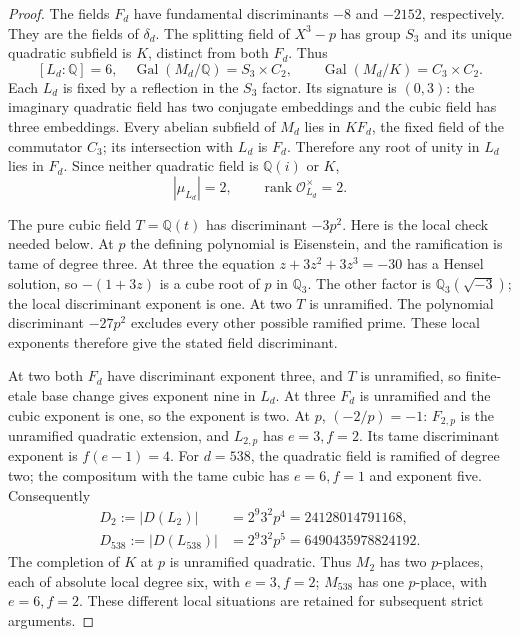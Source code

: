 \begin{proof}
The fields $F_d$ have fundamental discriminants $-8$ and $-2152$,
respectively.  They are the fields of $\delta_d$.
The splitting field of $X^3-p$ has group $S_3$ and its unique
quadratic subfield is $K$, distinct from both $F_d$.
Thus
\[
 [L_d:\mathbb Q]=6,\quad
 \operatorname{Gal}(M_d/\mathbb Q)=S_3\times C_2,
 \qquad \operatorname{Gal}(M_d/K)=C_3\times C_2.
 \tag{G150C.4}
\]
Each $L_d$ is fixed by a reflection in the $S_3$ factor.
Its signature is $(0,3)$: the imaginary quadratic field has two
conjugate embeddings and the cubic field has three embeddings.
Every abelian subfield of $M_d$ lies in $KF_d$, the fixed field
of the commutator $C_3$; its intersection with $L_d$ is $F_d$.
Therefore any root of unity in $L_d$ lies in $F_d$.
Since neither quadratic field is $\mathbb Q(i)$ or $K$,
\[
                 |\mu_{L_d}|=2,\qquad
                 \operatorname{rank}\mathcal O_{L_d}^{\times}=2.
 \tag{G150C.5}
\]

The pure cubic field $T=\mathbb Q(t)$ has discriminant $-3p^2$.
Here is the local check needed below.  At $p$ the defining
polynomial is Eisenstein, and the ramification is tame of degree three.
At three the equation $z+3z^2+3z^3=-30$ has a Hensel solution,
so $-(1+3z)$ is a cube root of $p$ in $\mathbb Q_3$.
The other factor is $\mathbb Q_3(\sqrt{-3})$; the local
discriminant exponent is one.  At two $T$ is unramified.
The polynomial discriminant $-27p^2$ excludes every other
possible ramified prime.  These local exponents therefore give
the stated field discriminant.

At two both $F_d$ have discriminant exponent three, and $T$
is unramified, so finite-etale base change gives exponent nine in $L_d$.
At three $F_d$ is unramified and the cubic exponent is one,
so the exponent is two.
At $p$, $(-2/p)=-1$: $F_{2,p}$ is the unramified quadratic
extension, and $L_{2,p}$ has $e=3,f=2$.
Its tame discriminant exponent is $f(e-1)=4$.
For $d=538$, the quadratic field is ramified of degree two;
the compositum with the tame cubic has $e=6,f=1$ and exponent five.
Consequently
\[
 \begin{aligned}
 D_2:=|D(L_2)|&=2^9 3^2p^4=24128014791168,\\
 D_{538}:=|D(L_{538})|&=2^9 3^2p^5=6490435978824192.
 \end{aligned}
 \tag{G150C.6}
\]
The completion of $K$ at $p$ is unramified quadratic.
Thus $M_2$ has two $p$-places, each of absolute local degree six,
with $e=3,f=2$; $M_{538}$ has one $p$-place, with $e=6,f=2$.
These different local situations are retained for subsequent strict arguments.


\end{proof}
